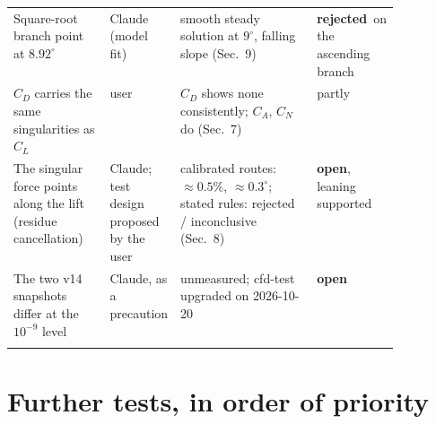 \documentclass[11pt,a4paper]{article}
\newcommand{\CL}{C_L}
\newcommand{\CD}{C_D}
\newcommand{\CN}{C_N}
\newcommand{\CA}{C_A}
\newcommand{\rej}{\textcolor{BrickRed}{\textbf{rejected}}}
\newcommand{\opn}{\textcolor{Goldenrod!80!black}{\textbf{open}}}
\begin{document}
{\begin{tabularx}{\linewidth}{>{\raggedright\arraybackslash}p{0.25\linewidth}>{\raggedright\arraybackslash}p{0.13\linewidth}>{\raggedright\arraybackslash}X>{\raggedright\arraybackslash}p{0.12\linewidth}}
Square-root branch point at $8.92^\circ$ & Claude (model fit) & smooth steady solution at $9^\circ$, falling
slope (Sec.~9) & \rej\ on the ascending branch\\\addlinespace[4pt]
$\CD$ carries the same singularities as $\CL$ & user & $\CD$ shows none consistently; $\CA$, $\CN$ do
(Sec.~7) & partly\\\addlinespace[4pt]
The singular force points along the lift (residue cancellation) & Claude; test design proposed by the
user & calibrated routes: $\approx0.5\%$, $\approx0.3^\circ$; stated rules: rejected / inconclusive
(Sec.~8) & \opn, leaning supported\\\addlinespace[4pt]
The two v14 snapshots differ at the $10^{-9}$ level & Claude, as a precaution & unmeasured; cfd-test upgraded
on 2026-10-20 & \opn\\\addlinespace[4pt]
\bottomrule
\end{tabularx}}

\section{Further tests, in order of priority}\label{sec:next}
\end{document}
